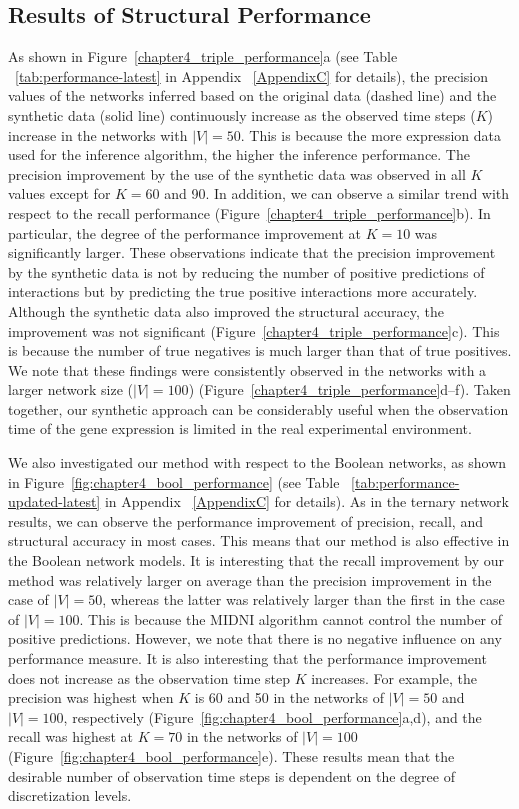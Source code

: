 \subsection{Results of Structural Performance}
 As shown in Figure~\ref{chapter4_triple_performance}a (see Table ~\ref{tab:performance-latest} in Appendix ~\ref{AppendixC} for details), the precision values of the networks inferred based on the original data (dashed line) and the synthetic data (solid line) continuously increase as the observed time steps (\(K\)) increase in the networks with \(|V|=50\). This is because the more expression data used for the inference algorithm, the higher the inference performance. The precision improvement by the use of the synthetic data was observed in all \(K\) values except for \(K=60\) and 90. In addition, we can observe a similar trend with respect to the recall performance (Figure~\ref{chapter4_triple_performance}b). In particular, the degree of the performance improvement at \(K=10\) was significantly larger. These observations indicate that the precision improvement by the synthetic data is not by reducing the number of positive predictions of interactions but by predicting the true positive interactions more accurately. Although the synthetic data also improved the structural accuracy, the improvement was not significant (Figure~\ref{chapter4_triple_performance}c). This is because the number of true negatives is much larger than that of true positives. We note that these findings were consistently observed in the networks with a larger network size (\(|V|=100\)) (Figure~\ref{chapter4_triple_performance}d--f). Taken together, our synthetic approach can be considerably useful when the observation time of the gene expression is limited in the real experimental environment. \par
We also investigated our method with respect to the Boolean networks, as shown in Figure~\ref{fig:chapter4_bool_performance} (see Table ~\ref{tab:performance-updated-latest} in Appendix ~\ref{AppendixC} for details). As in the ternary network results, we can observe the performance improvement of precision, recall, and structural accuracy in most cases. This means that our method is also effective in the Boolean network models. It is interesting that the recall improvement by our method was relatively larger on average than the precision improvement in the case of \(|V|=50\), whereas the latter was relatively larger than the first in the case of \(|V|=100\). This is because the MIDNI algorithm cannot control the number of positive predictions. However, we note that there is no negative influence on any performance measure. It is also interesting that the performance improvement does not increase as the observation time step \(K\) increases. For example, the precision was highest when \(K\) is 60 and 50 in the networks of \(|V|=50\) and \(|V|=100\), respectively (Figure~\ref{fig:chapter4_bool_performance}a,d), and the recall was highest at \(K=70\) in the networks of \(|V|=100\) (Figure~\ref{fig:chapter4_bool_performance}e). These results mean that the desirable number of observation time steps is dependent on the degree of discretization levels. \par
